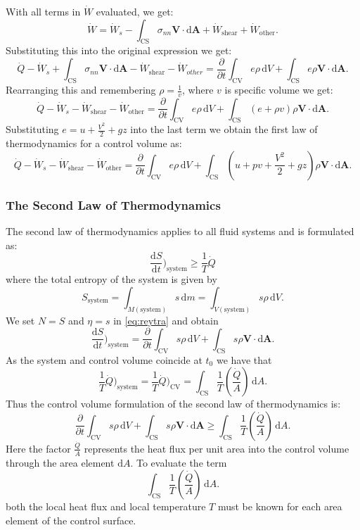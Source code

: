 With all terms in $\dot{W}$ evaluated, we get:
\[ 
\dot{W} = \dot{W}_s - \int_{\mathrm{CS}} \sigma_{nn} \textbf{V} \cdot \mathrm{d} \textbf{A} + \dot{W}_{\mathrm{shear}} + \dot{W}_{\mathrm{other}}
.\]
Substituting this into the original expression we get:
\[ 
\dot{Q} - \dot{W}_s + \int_{\mathrm{CS}} \sigma_{nn} \textbf{V} \cdot \mathrm{d}\textbf{A} - \dot{W}_{\mathrm{shear}} - \dot{W}_{other} = \frac{\partial }{\partial t} \int_{\mathrm{CV}} e \rho \, \mathrm{d}V + \int_{\mathrm{CS}} e \rho \textbf{V} \cdot \mathrm{d}\textbf{A}
.\]
Rearranging this and remembering $\rho = \frac{1}{v}$, where $v$ is specific volume we get:
\[ 
\dot{Q} - \dot{W}_s - \dot{W}_{\mathrm{shear}} - \dot{W}_{\mathrm{other}} = \frac{\partial }{\partial t}\int_{\mathrm{CV}} e \rho \, \mathrm{d}V + \int_{\mathrm{CS}} \left( e + \rho v \right)\rho \textbf{V} \cdot \mathrm{d}\textbf{A}
.\]
Substituting $e = u + \frac{V^2}{2} + gz$ into the last term we obtain the first law of thermodynamics for a control volume as:
\[ 
\dot{Q} - \dot{W}_s - \dot{W}_{\mathrm{shear}} - \dot{W}_{\mathrm{other}} = \frac{\partial }{\partial t} \int_{\mathrm{CV}} e \rho \, \mathrm{d}V + \int_{\mathrm{CS}} \left( u + p v + \frac{V^2}{2} + gz \right) \rho \textbf{V} \cdot \mathrm{d}\textbf{A}
.\]


\subsubsection{The Second Law of Thermodynamics}
The second law of thermodynamics applies to all fluid systems and is formulated as:
\[ 
\frac{\mathrm{d}S}{\mathrm{d}t} \bigg)_{\mathrm{system}} \geq \frac{1}{T} \dot{Q}
\]
where the total entropy of the system is given by
\[ 
S_{\mathrm{system}} = \int_{M (\mathrm{system})} s \, \mathrm{d}m = \int_{V (\mathrm{system})} s \rho \, \mathrm{d}V
.\]
We set $N = S$ and $\eta = s$ in \autoref{eq:reytra} and obtain
\[ 
\frac{\mathrm{d}S}{\mathrm{d}t} \bigg)_{\mathrm{system}} = \frac{\partial }{\partial t} \int_{\mathrm{CV}} s \rho \, \mathrm{d}V + \int_{\mathrm{CS}} s \rho \textbf{V} \cdot \mathrm{d}\textbf{A}
.\]
As the system and control volume coincide at $t_0$ we have that
\[ 
  \frac{1}{T} \dot{Q})_{\mathrm{system}} = \frac{1}{T}\dot{Q})_{\mathrm{CV}} = \int_{\mathrm{CS}} \frac{1}{T} \left( \frac{\dot{Q}}{A} \right) \, \mathrm{d}A 
.\]
Thus the control volume formulation of the second law of thermodynamics is:
\[ 
\frac{\partial }{\partial t} \int_{\mathrm{CV}} s \rho \, \mathrm{d}V + \int_{\mathrm{CS}} s \rho \textbf{V} \cdot \mathrm{d} \textbf{A} \geq \int_{\mathrm{CS}} \frac{1}{T} \left( \frac{\dot{Q}}{A} \right) \, \mathrm{d}A
.\]
Here the factor $\frac{\dot{Q}}{A}$ represents the heat flux per unit area into the control volume through the area element $\mathrm{d}A$. To evaluate the term
\[ 
\int_{\mathrm{CS}} \frac{1}{T} \left( \frac{\dot{Q}}{A} \right) \, \mathrm{d}A
.\]
both the local heat flux and local temperature $T$ must be known for each area element of the control surface.
